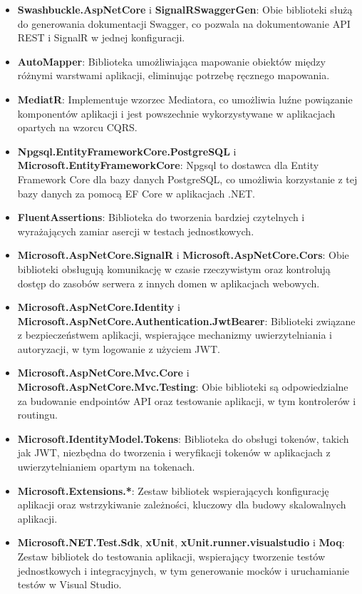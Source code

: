\documentclass[12pt,a4paper]{article}
\begin{document}
\begin{itemize} 
    \item \textbf{Swashbuckle.AspNetCore} i \textbf{SignalRSwaggerGen}: Obie biblioteki służą do generowania dokumentacji Swagger, co pozwala na dokumentowanie API REST i SignalR w jednej konfiguracji. 
    \item \textbf{AutoMapper}: Biblioteka umożliwiająca mapowanie obiektów między różnymi warstwami aplikacji, eliminując potrzebę ręcznego mapowania. 
    \item \textbf{MediatR}: Implementuje wzorzec Mediatora, co umożliwia luźne powiązanie komponentów aplikacji i jest powszechnie wykorzystywane w aplikacjach opartych na wzorcu CQRS. 
    \item \textbf{Npgsql.EntityFrameworkCore.PostgreSQL} i \textbf{Microsoft.EntityFrameworkCore}: Npgsql to dostawca dla Entity Framework Core dla bazy danych PostgreSQL, co umożliwia korzystanie z tej bazy danych za pomocą EF Core w aplikacjach .NET. 
    \item \textbf{FluentAssertions}: Biblioteka do tworzenia bardziej czytelnych i wyrażających zamiar asercji w testach jednostkowych. 
    \item \textbf{Microsoft.AspNetCore.SignalR} i \textbf{Microsoft.AspNetCore.Cors}: Obie biblioteki obsługują komunikację w czasie rzeczywistym oraz kontrolują dostęp do zasobów serwera z innych domen w aplikacjach webowych. 
    \item \textbf{Microsoft.AspNetCore.Identity} i \textbf{Microsoft.AspNetCore.Authentication.JwtBearer}: Biblioteki związane z bezpieczeństwem aplikacji, wspierające mechanizmy uwierzytelniania i autoryzacji, w tym logowanie z użyciem JWT. 
    \item \textbf{Microsoft.AspNetCore.Mvc.Core} i \textbf{Microsoft.AspNetCore.Mvc.Testing}: Obie biblioteki są odpowiedzialne za budowanie endpointów API oraz testowanie aplikacji, w tym kontrolerów i routingu. 
    \item \textbf{Microsoft.IdentityModel.Tokens}: Biblioteka do obsługi tokenów, takich jak JWT, niezbędna do tworzenia i weryfikacji tokenów w aplikacjach z uwierzytelnianiem opartym na tokenach. 
    \item \textbf{Microsoft.Extensions.*}: Zestaw bibliotek wspierających konfigurację aplikacji oraz wstrzykiwanie zależności, kluczowy dla budowy skalowalnych aplikacji.
    \item \textbf{Microsoft.NET.Test.Sdk}, \textbf{xUnit}, \textbf{xUnit.runner.visualstudio} i \textbf{Moq}: Zestaw bibliotek do testowania aplikacji, wspierający tworzenie testów jednostkowych i integracyjnych, w tym generowanie mocków i uruchamianie testów w Visual Studio. 
\end{itemize}
\end{document}
